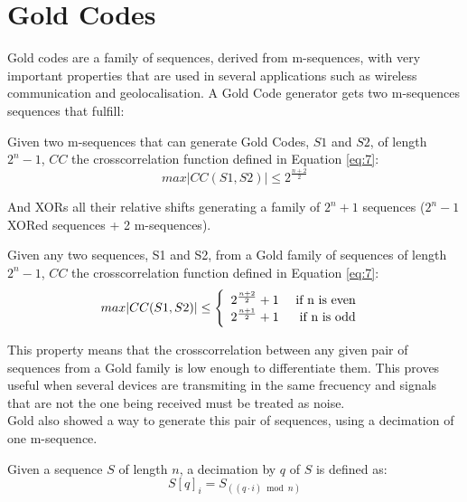\section{Gold Codes}

Gold codes\cite{gold_codes} are a family of sequences, derived from
m-sequences, with very important properties that are used in several
applications such as wireless communication and geolocalisation. A Gold Code
generator gets two m-sequences sequences that fulfill:

\begin{property}
  Given two m-sequences that can generate Gold Codes, $S1$ and $S2$, of length
  $2^{n}-1$, $CC$ the crosscorrelation function defined in Equation \eqref{eq:7}:
    \begin{equation}\label{gold:eq:1}
      max |CC(S1, S2)| \leq 2^{\frac{n+2}{2}}
    \end{equation}
\end{property}

And XORs all their relative shifts generating a family of $2^{n} + 1$ sequences
($2^{n} - 1$ XORed sequences + 2 m-sequences).

\begin{property}
  Given any two sequences, S1 and S2, from a Gold family of sequences of length
  $2^{n}-1$, $CC$ the crosscorrelation function defined in Equation \eqref{eq:7}:
  \begin{equation}
        max |CC(S1, S2)| \leq \left\{\begin{array}{lr}
            2^{\frac{n+2}{2}}+1 & \textnormal{ if n is even } \\
            2^{\frac{n+1}{2}}+1 & \textnormal{ if n is odd } \\
        \end{array}\right.
  \end{equation}
\end{property}

This property means that the crosscorrelation between any given pair of
sequences from a Gold family is low enough to differentiate them. This proves
useful when several devices are transmiting in the same frecuency and
signals that are not the one being received must be treated as
noise.\\

Gold also showed  a way to generate this pair of sequences,
using a decimation of one m-sequence.

\begin{definition}[Decimation]
  Given a sequence $S$ of length $n$, a decimation by $q$ of $S$ is defined as:
  \begin{equation}
    S[q]_{i} = S_{((q·i) \bmod n)}
  \end{equation}
\end{definition}

